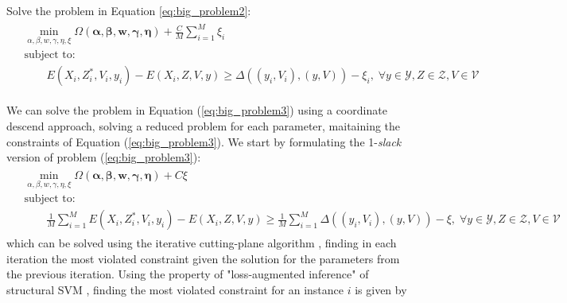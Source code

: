 \documentclass[10pt,letterpaper]{article}
\newcommand{\+}[1]{\ensuremath{{\boldsymbol #1}}}
\begin{document}
Solve the problem in Equation \ref{eq:big_problem2}:
\begin{align}
\label{eq:big_problem3}
\begin{split}
& \min_{\alpha, \beta, w,\gamma,\eta, \xi}
      \Omega(\+{\alpha},\+{\beta},\+{w},\+{\gamma},\+{\eta})
 + \frac{C}{M} \sum_{i=1}^M \xi_i \\
& \text{subject to:} \\
& \quad\quad   E(X_i, Z_i^*, V_i, y_i) - E(X_i, Z, V, y)
      \geq \Delta( (y_i, V_i), (y, V)) - \xi_i, \;
      \forall y \in \mathcal{Y}, Z \in \mathcal{Z},
      V \in \mathcal{V}
\end{split}
\end{align}

We can solve the problem in Equation (\ref{eq:big_problem3}) using a coordinate descend approach, solving a reduced problem for each parameter, maitaining the constraints of Equation (\ref{eq:big_problem3}).  We start by formulating the 1-\emph{slack} version \cite{cuttingPlaneSVM} of problem (\ref{eq:big_problem3}):
\begin{align}
\label{eq:big_problem3_1_slack}
\begin{split}
& \min_{\alpha, \beta, w,\gamma,\eta, \xi}
      \Omega(\+{\alpha},\+{\beta},\+{w},\+{\gamma},\+{\eta})
 + C\xi \\
& \text{subject to:} \\
& \quad\quad  \frac{1}{M}\sum_{i=1}^M E(X_i, Z_i^*, V_i, y_i) - E(X_i, Z, V, y)
      \geq  \frac{1}{M}\sum_{i=1}^M\Delta( (y_i, V_i), (y, V)) - \xi, \;
      \forall y \in \mathcal{Y}, Z \in \mathcal{Z},
      V \in \mathcal{V}
\end{split}
\end{align}
which can be solved using the iterative cutting-plane algorithm \cite{cuttingPlaneSVM}, finding in each iteration the most violated constraint given the solution for the parameters from the previous iteration. Using the property of "loss-augmented inference" of structural SVM \cite{latentSVM},
finding the most violated constraint for an instance $i$ is given by
\end{document}
